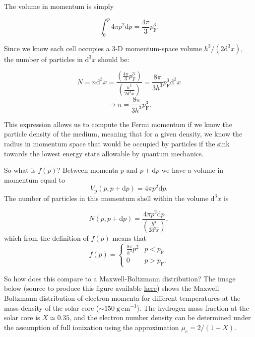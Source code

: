 \documentclass[twocolumn]{article}
\begin{document}
The volume in momentum is simply

\[\int_0^p 4\pi p^2 \mathrm{d} p = \frac{4\pi}{3}p_\mathrm{F}^3.\]

Since we know each cell occupies a 3-D momentum-space volume
\(h^3/(2\mathrm{d}^3x)\), the number of particles in \(\mathrm{d}^3x\)
should be:

\[N=n\mathrm{d}^3x = \frac{\left(\displaystyle \frac{4\pi}{3}p_\mathrm{F}^3\right)}{\displaystyle \left(\frac{h^3}{2\mathrm{d}^3x}\right)}=\frac{8\pi}{3h^3}p_\mathrm{F}^3 \mathrm{d}^3 x\]
\[\rightarrow n=\frac{8\pi}{3h^3}p_\mathrm{F}^3.\]

This expression allows us to compute the Fermi momentum if we know the
particle density of the medium, meaning that for a given density, we
know the radius in momentum space that would be occupied by particles if
the sink towards the lowest energy state allowable by quantum mechanics.

So what is \(f(p)\)? Between momenta \(p\) and \(p+\mathrm{d}p\) we have
a volume in momentum equal to
\[V_\mathrm{p}(p,p+\mathrm{d}p)=4\pi p^2\mathrm{d}p.\] The number of
particles in this momentum shell within the volume \(\mathrm{d}^3 x\) is

\[N(p,p+\mathrm{d}p)=\frac{4\pi p^2 \mathrm{d}p}{\displaystyle\left(\frac{h^3}{2\mathrm{d}^3 x}\right)},\]
which from the definition of \(f(p)\) means that \[\boxed{f(p)=
\begin{cases}
\displaystyle \frac{8\pi}{h^3}p^2 & p<p_\mathrm{F} \\
0 & p>p_\mathrm{F}.
\end{cases}}\tag{3.3}
\]

So how does this compare to a Maxwell-Boltzmann distribution? The image
below (source to produce this figure available
\href{assets/4_eos2/MB_versus_degenerate.jl}{here}) shows the Maxwell
Boltzmann distribution of electron momenta for different temperatures at
the mass density of the solar core (\(\sim 150\;\mathrm{g\,cm}^{-3}\)).
The hydrogen mass fraction at the solar core is \(X\simeq 0.35\), and
the electron number density can be determined under the assumption of
full ionization using the approximation \(\mu_e=2/(1+X)\).
\end{document}
